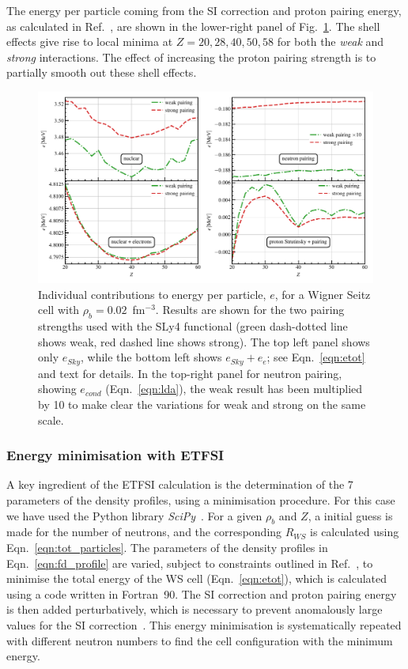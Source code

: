 \documentclass[
    amsmath,amssymb,
    aps,
    prc,
    floatfix,
]{revtex4-2}
\begin{document}
The energy per particle coming from the SI correction and proton pairing energy, as calculated in Ref.~\cite{pearson2015role}, are shown in the lower-right panel of Fig.~\ref{fig:e_contributions}. The shell effects give rise to local minima at $Z=20,28,40,50,58$ for both the \emph{weak} and \emph{strong} interactions. The effect of increasing the proton pairing strength is to partially smooth out these shell effects.

    \begin{figure}
        \centering
        \includegraphics{figs/e_contributions.pdf}
        \caption{Individual contributions to energy per particle, $e$, for a Wigner Seitz cell with $\rho_b=0.02$~fm$^{-3}$. Results are shown for the two pairing strengths used with the SLy4 functional (green dash-dotted line shows weak, red dashed line shows strong). The top left panel shows only $e_{Sky}$, while the bottom left shows $e_{Sky}+e_e$; see Eqn.~\ref{eqn:etot} and text for details. In the top-right panel for neutron pairing, showing $e_{cond}$ (Eqn.~\ref{eqn:lda}), the weak result has been multiplied by 10 to make clear the variations for weak and strong on the same scale.}
        \label{fig:e_contributions}
    \end{figure}


\subsubsection{Energy minimisation with ETFSI}\label{subsubsec:min}

A key ingredient of the ETFSI calculation is the determination of the 7 parameters of the density profiles, using a minimisation procedure.
For this case we have used the Python library \emph{SciPy}~\cite{scipy1.0contributorsSciPyFundamentalAlgorithms2020}. For a given $\rho_b$ and $Z$, a initial guess is made for the number of neutrons, and the corresponding $R_{WS}$ is calculated using Eqn.~\ref{eqn:tot_particles}. The parameters of the density profiles in Eqn.~\ref{eqn:fd_profile} are varied, subject to constraints outlined in Ref.~\cite{onsi2008semi}, to minimise the total energy of the WS cell (Eqn.~\ref{eqn:etot}), which is calculated using a code written in Fortran~90. The SI correction and proton pairing energy is then added perturbatively, which is necessary to prevent anomalously large values for the SI correction~\cite{pearsonInnerCrustNeutron2012}. This energy minimisation is systematically repeated with different neutron numbers to find the cell configuration with the minimum energy.
\end{document}
